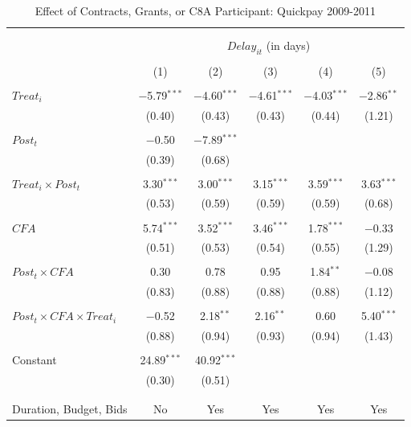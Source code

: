 \documentclass[]{article}
\begin{document}
\begin{table}[H] \centering 
  \caption{Effect of Contracts, Grants, or C8A Participant: Quickpay 2009-2011} 
  \label{} 
\small 
\begin{tabular}{@{\extracolsep{-2pt}}lccccc} 
\\[-1.8ex]\hline 
\hline \\[-1.8ex] 
\\[-1.8ex] & \multicolumn{5}{c}{$Delay_{it}$ (in days)} \\ 
\\[-1.8ex] & (1) & (2) & (3) & (4) & (5)\\ 
\hline \\[-1.8ex] 
 $Treat_i$ & $-$5.79$^{***}$ & $-$4.60$^{***}$ & $-$4.61$^{***}$ & $-$4.03$^{***}$ & $-$2.86$^{**}$ \\ 
  & (0.40) & (0.43) & (0.43) & (0.44) & (1.21) \\ 
  & & & & & \\ 
 $Post_t$ & $-$0.50 & $-$7.89$^{***}$ &  &  &  \\ 
  & (0.39) & (0.68) &  &  &  \\ 
  & & & & & \\ 
 $Treat_i \times Post_t$ & 3.30$^{***}$ & 3.00$^{***}$ & 3.15$^{***}$ & 3.59$^{***}$ & 3.63$^{***}$ \\ 
  & (0.53) & (0.59) & (0.59) & (0.59) & (0.68) \\ 
  & & & & & \\ 
 $CFA$ & 5.74$^{***}$ & 3.52$^{***}$ & 3.46$^{***}$ & 1.78$^{***}$ & $-$0.33 \\ 
  & (0.51) & (0.53) & (0.54) & (0.55) & (1.29) \\ 
  & & & & & \\ 
 $Post_t \times CFA$ & 0.30 & 0.78 & 0.95 & 1.84$^{**}$ & $-$0.08 \\ 
  & (0.83) & (0.88) & (0.88) & (0.88) & (1.12) \\ 
  & & & & & \\ 
 $Post_t \times CFA \times Treat_i$ & $-$0.52 & 2.18$^{**}$ & 2.16$^{**}$ & 0.60 & 5.40$^{***}$ \\ 
  & (0.88) & (0.94) & (0.93) & (0.94) & (1.43) \\ 
  & & & & & \\ 
 Constant & 24.89$^{***}$ & 40.92$^{***}$ &  &  &  \\ 
  & (0.30) & (0.51) &  &  &  \\ 
  & & & & & \\ 
\hline \\[-1.8ex] 
Duration, Budget, Bids & No & Yes & Yes & Yes & Yes \\ 

\end{tabular}
\end{table}
\end{document}
